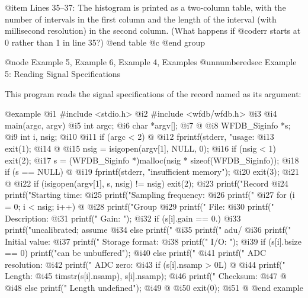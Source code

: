 {{{{{{{{{{@item Lines 35--37:
The histogram is printed as a two-column table, with the number of
intervals in the first column and the length of the interval (with
millisecond resolution) in the second column. (What happens if
@code{rr} starts at 0 rather than 1 in line 35?)
@end table
@c @end group

@node     Example 5, Example 6, Example 4, Examples
@unnumberedsec Example 5: Reading Signal Specifications

This program reads the signal specifications of the record named as its
argument:

@example
 @i{1}  #include <stdio.h>
 @i{2}  #include <wfdb/wfdb.h>
 @i{3}
 @i{4}  main(argc, argv)
 @i{5}  int argc;
 @i{6}  char *argv[];
 @i{7}  @{
 @i{8}      WFDB_Siginfo *s;
 @i{9}      int i, nsig;
@i{10}
@i{11}      if (argc < 2) @{
@i{12}          fprintf(stderr, "usage: %
@i{13}          exit(1);
@i{14}      @}
@i{15}      nsig = isigopen(argv[1], NULL, 0);
@i{16}      if (nsig < 1) exit(2);
@i{17}      s = (WFDB_Siginfo *)malloc(nsig * sizeof(WFDB_Siginfo));
@i{18}      if (s == NULL) @{
@i{19}          fprintf(stderr, "insufficient memory\n");
@i{20}	        exit(3);
@i{21}      @}
@i{22}      if (isigopen(argv[1], s, nsig) != nsig) exit(2);
@i{23}      printf("Record %
@i{24}      printf("Starting time: %
@i{25}      printf("Sampling frequency: %
@i{26}      printf("%
@i{27}      for (i = 0; i < nsig; i++) @{
@i{28}          printf("Group %
@i{29}          printf(" File: %
@i{30}          printf(" Description: %
@i{31}          printf(" Gain: ");
@i{32}          if (s[i].gain == 0.)
@i{33}              printf("uncalibrated; assume %
@i{34}          else printf("%
@i{35}          printf(" adu/%
@i{36}          printf(" Initial value: %
@i{37}          printf(" Storage format: %
@i{38}          printf(" I/O: ");
@i{39}          if (s[i].bsize == 0) printf("can be unbuffered\n");
@i{40}          else printf("%
@i{41}          printf(" ADC resolution: %
@i{42}          printf(" ADC zero: %
@i{43}          if (s[i].nsamp > 0L) @{
@i{44}              printf(" Length: %
@i{45}                     timstr(s[i].nsamp), s[i].nsamp);
@i{46}              printf(" Checksum: %
@i{47}          @}
@i{48}          else printf(" Length undefined\n");
@i{49}      @}
@i{50}      exit(0);
@i{51}  @}
@end example

}}}}}}}}}}

